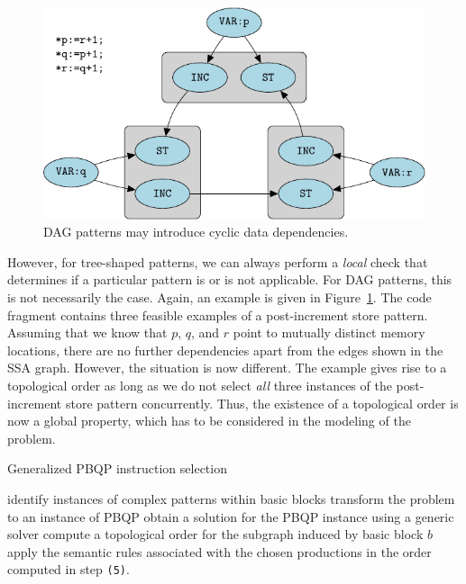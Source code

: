 \begin{figure}[t]
    \includegraphics{pgf-fig008}
  \caption{DAG patterns may introduce cyclic data dependencies.}\label{fig:topology}
\end{figure}

However, for tree-shaped patterns, we can always perform a
\emph{local} check that determines if a particular pattern is or is
not applicable. For DAG patterns, this is not necessarily the
case. Again, an example is given in Figure~\ref{fig:topology}.  The
code fragment contains three feasible examples of a post-increment
store pattern. Assuming that we know that $p$, $q$, and $r$ point to
mutually distinct memory locations, there are no further dependencies
apart from the edges shown in the SSA graph.  However, the situation
is now different.  The example gives rise to a topological order as
long as we do not select \emph{all} three instances of the
post-increment store pattern concurrently. Thus, the existence of a
topological order is now a global property, which has to be considered
in the modeling of the problem.

\begin{algorithm}
\caption{Generalized PBQP instruction selection}
\label{alg:pbqpisel}
\begin{algorithmic}[1]
  \STATE identify instances of complex patterns within basic blocks
  \STATE transform the problem to an instance of PBQP
  \STATE obtain a solution for the PBQP instance using a generic
  solver
    \STATE compute a topological order for the subgraph
    induced by basic block $b$
    \STATE apply the semantic rules associated with the chosen
    productions in the order computed in step \texttt{(5)}.
  \ENDFOR
\end{algorithmic}
\end{algorithm}

